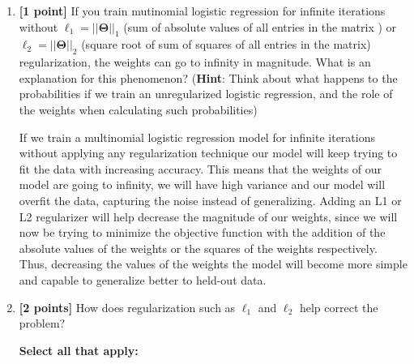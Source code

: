\documentclass[11pt]{article}
\numberwithin{equation}{section} %
\numberwithin{figure}{section} %
\numberwithin{table}{section} %
\newcommand{\Thetav     }{\boldsymbol \Theta     }
\begin{document}
\begin{enumerate}[label=(\alph*)]
\begin{solution}
    \end{solution}
    
  
    \item {\bf [1 point]} If you train mutinomial logistic regression for infinite iterations without $\ell_1 = ||\Thetav||_1$ (sum of absolute values of all entries in the matrix ) or $\ell_2=||\Thetav||_2$ (square root of sum of squares of all entries in the matrix) regularization, the weights can go to infinity in magnitude. What is an explanation for this phenomenon? (\textbf{Hint}: Think about what happens to the probabilities if we train an unregularized logistic regression, and the role of the weights when calculating such probabilities)
    
     \begin{solution}
    If we train a multinomial logistic regression model for infinite iterations without applying any regularization technique our model will keep trying to fit the data with increasing accuracy. This means that the weights of our model are going to infinity, we will have high variance and our model will overfit the data, capturing the noise instead of generalizing. Adding an L1 or L2 regularizer will help decrease the magnitude of our weights, since we will now be trying to minimize the objective function with the addition of the absolute values of the weights or the squares of the weights respectively. Thus, decreasing the values of the weights the model will become more simple and capable to generalize better to held-out data.
    \end{solution}
    
    \clearpage
         
    \item {\bf [2 points]} How does regularization such as $\ell_1$ and $\ell_2$ help correct the problem?
    
    \textbf{Select all that apply:}

    
    \clearpage
   
    
\end{enumerate}
\end{document}
